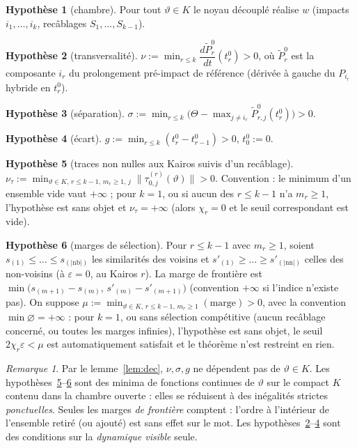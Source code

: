 \documentclass[11pt,a4paper]{article}
\theoremstyle{remark}
\newtheorem{remarque}[theoreme]{Remarque}
\theoremstyle{definition}
\newtheorem{hyp}{Hypothèse}
\newcommand{\norm}[1]{\lVert #1\rVert}
\newcommand{\eps}{\varepsilon}
\newcommand{\vth}{\vartheta}
\newcommand{\Pt}{\widetilde P}
\begin{document}
\begin{hyp}[chambre]\label{h:ch} Pour tout $\vth\in K$ le noyau découplé réalise $w$ (impacts $i_1,\dots,i_k$, recâblages $S_1,\dots,S_{k-1}$).\end{hyp}
\begin{hyp}[transversalité]\label{h:nu} $\nu:=\min_{r\le k}\dfrac{d\Pt^0_r}{dt}(t_r^0)>0$, où $\Pt^0_r$ est la composante $i_r$ du prolongement pré-impact de référence (dérivée à gauche du $P_{i_r}$ hybride en $t_r^0$).\end{hyp}
\begin{hyp}[séparation]\label{h:sig} $\sigma:=\min_{r\le k}\bigl(\Theta-\max_{j\ne i_r}\Pt^0_{r,j}(t_r^0)\bigr)>0$.\end{hyp}
\begin{hyp}[écart]\label{h:g} $g:=\min_{r\le k}(t_r^0-t_{r-1}^0)>0$, $t_0^0:=0$.\end{hyp}
\begin{hyp}[traces non nulles aux Kairos suivis d'un recâblage]\label{h:tau} $\nu_\tau:=\min_{\vth\in K,\,r\le k-1,\,m_r\ge1,\,j}\norm{\tau_{0,j}^{(r)}(\vth)}>0$. Convention : le minimum d'un ensemble vide vaut $+\infty$ ; pour $k=1$, ou si aucun des $r\le k-1$ n'a $m_r\ge1$, l'hypothèse est sans objet et $\nu_\tau=+\infty$ (alors $\chi_r=0$ et le seuil correspondant est vide).\end{hyp}
\begin{hyp}[marges de sélection]\label{h:mu}
Pour $r\le k-1$ avec $m_r\ge1$, soient $s_{(1)}\le\dots\le s_{(|\mathrm{nb}|)}$ les similarités des voisins et $s'_{(1)}\ge\dots\ge s'_{(|\mathrm{nn}|)}$ celles des non-voisins (à $\eps=0$, au Kairos $r$). La marge de frontière est $\min\bigl(s_{(m+1)}-s_{(m)},\,s'_{(m)}-s'_{(m+1)}\bigr)$ (convention $+\infty$ si l'indice n'existe pas). On suppose $\mu:=\min_{\vth\in K,\,r\le k-1,\,m_r\ge1}(\text{marge})>0$, avec la convention $\min\varnothing=+\infty$ : pour $k=1$, ou sans sélection compétitive (aucun recâblage concerné, ou toutes les marges infinies), l'hypothèse est sans objet, le seuil $2\chi_r\eps<\mu$ est automatiquement satisfait et le théorème n'est restreint en rien.
\end{hyp}

\begin{remarque}
Par le lemme~\ref{lem:dec}, $\nu,\sigma,g$ ne dépendent pas de $\vth\in K$. Les hypothèses~\ref{h:tau}--\ref{h:mu} sont des minima de fonctions continues de $\vth$ sur le compact $K$ contenu dans la chambre ouverte : elles se réduisent à des inégalités strictes \emph{ponctuelles}. Seules les marges \emph{de frontière} comptent : l'ordre à l'intérieur de l'ensemble retiré (ou ajouté) est sans effet sur le mot. Les hypothèses~\ref{h:nu}--\ref{h:g} sont des conditions sur la \emph{dynamique visible} seule.
\end{remarque}
\end{document}
